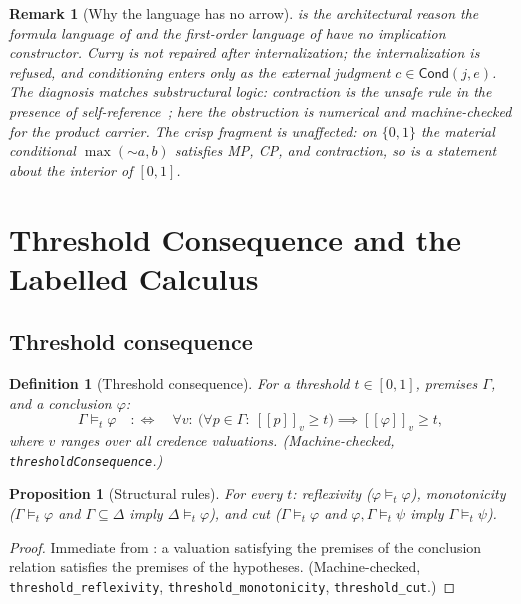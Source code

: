 \documentclass[11pt,a4paper]{article}
\newtheorem{proposition}[theorem]{Proposition}
\newtheorem{definition}[theorem]{Definition}
\newtheorem{remark}[theorem]{Remark}
\newcommand{\negc}{\mathord{\sim}}
\newcommand{\Cond}{\mathsf{Cond}}
\newcommand{\evalc}[2]{[\![ {#2} ]\!]_{#1}}
\begin{document}
\begin{remark}[Why the language has no arrow]
\label{rem:no-arrow}
 is the architectural reason the formula language
of  and the first-order language of 
have no implication constructor.
Curry is not repaired after internalization; the internalization is
refused, and conditioning enters only as the external judgment
$c \in \Cond(j,e)$.
The diagnosis matches substructural logic: contraction is the unsafe
rule in the presence of self-reference~\cite{restall1993}; here the
obstruction is numerical and machine-checked for the product carrier.
The crisp fragment is unaffected: on $\{0,1\}$ the material conditional
$\max(\negc a, b)$ satisfies MP, CP, and contraction, so
 is a statement about the interior of $[0,1]$.
\end{remark}

\section{Threshold Consequence and the Labelled Calculus}
\label{sec:proof}

\subsection{Threshold consequence}

\begin{definition}[Threshold consequence]
\label{def:threshold}
For a threshold $t \in [0,1]$, premises $\Gamma$, and a conclusion
$\varphi$:
\[
  \Gamma \models_t \varphi
  \quad:\iff\quad
  \forall v:\
  \bigl(\forall p \in \Gamma:\ \evalc{v}{p} \geq t\bigr)
  \implies \evalc{v}{\varphi} \geq t,
\]
where $v$ ranges over all credence valuations.
(Machine-checked, \texttt{thresholdConsequence}.)
\end{definition}

\begin{proposition}[Structural rules]
\label{prop:threshold-structural}
For every $t$: reflexivity ($\varphi \models_t \varphi$),
monotonicity ($\Gamma \models_t \varphi$ and
$\Gamma \subseteq \Delta$ imply $\Delta \models_t \varphi$), and cut
($\Gamma \models_t \varphi$ and
$\varphi, \Gamma \models_t \psi$ imply $\Gamma \models_t \psi$).
\end{proposition}
\begin{proof}
Immediate from : a valuation satisfying the
premises of the conclusion relation satisfies the premises of the
hypotheses.
(Machine-checked, \texttt{threshold\_reflexivity},
\texttt{threshold\_monotonicity}, \texttt{threshold\_cut}.)
\end{proof}
\end{document}
